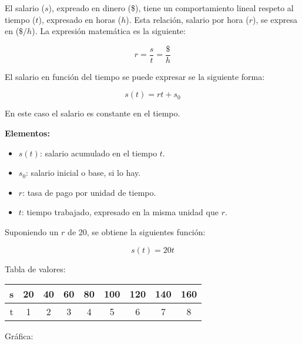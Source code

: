El salario ($s$), expreado en dinero (\$), tiene un comportamiento lineal respeto al tiempo ($t$), expresado en horas ($h$). Esta relación, salario por hora ($r$), se expresa en ($\$/h$). La expresión matemática es la siguiente:

\[
  r = \dfrac{s}{t} = \dfrac{\$}{h}
\]

El salario en función del tiempo se puede expresar se la siguiente forma:

\[\boxed{
  s(t) = rt + s_0
}\]

En este caso el salario es constante en el tiempo.

\textbf{Elementos:}

\begin{itemize}
  \item $s(t)$: salario acumulado en el tiempo $t$.
  \item $s_0$: salario inicial o base, si lo hay.
  \item $r$: tasa de pago por unidad de tiempo.
  \item $t$: tiempo trabajado, expresado en la misma unidad que $r$.
\end{itemize}

Suponiendo un $r$ de 20, se obtiene la siguientes función:

\[
  s(t) = 20t
\]

Tabla de valores:

\begin{center}
\begin{tabular}{|c|c|c|c|c|c|c|c|c|}
  \hline
  s & 20 & 40 & 60 & 80 & 100 & 120 & 140 & 160 \\
  \hline
  t & 1 & 2 & 3 & 4 & 5 & 6 & 7 & 8 \\
  \hline
\end{tabular}
\end{center}

Gráfica:


